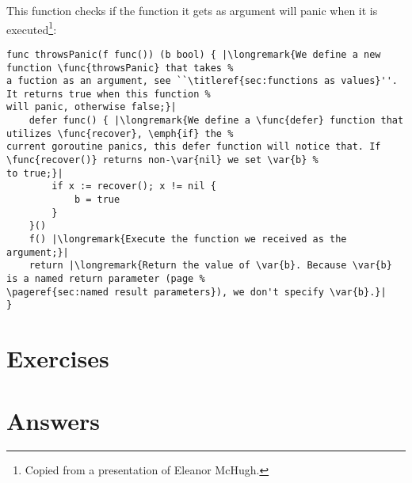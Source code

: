 This function checks if the function it gets as argument will panic when it is
executed\footnote{Copied from a presentation of Eleanor McHugh.}:
\begin{lstlisting}
func throwsPanic(f func()) (b bool) { |\longremark{We define a new function \func{throwsPanic} that takes %
a fuction as an argument, see ``\titleref{sec:functions as values}''. It returns true when this function %
will panic, otherwise false;}|
    defer func() { |\longremark{We define a \func{defer} function that utilizes \func{recover}, \emph{if} the %
current goroutine panics, this defer function will notice that. If \func{recover()} returns non-\var{nil} we set \var{b} %
to true;}|
        if x := recover(); x != nil {
            b = true
        }
    }()
    f() |\longremark{Execute the function we received as the argument;}|
    return |\longremark{Return the value of \var{b}. Because \var{b} is a named return parameter (page %
\pageref{sec:named result parameters}), we don't specify \var{b}.}|
}
\end{lstlisting}
\showremarks


\section{Exercises}




















\cleardoublepage
\section{Answers}
\shipoutAnswer
